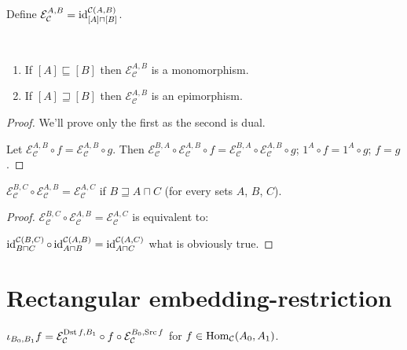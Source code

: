 \begin{defn}
Define $\mathcal{E}_{\mathcal{C}}^{A,B} =
\operatorname{id}^{\mathcal{C}(A,B)}_{[A]\sqcap[B]}$.
\end{defn}

\begin{prop}\label{e-mono-epi}
  ~  
  \begin{enumerate}
    \item If $[A]\sqsubseteq[B]$ then $\mathcal{E}_{\mathcal{C}}^{A,B}$ is a
    monomorphism.
    
    \item If $[A]\sqsupseteq[B]$ then $\mathcal{E}_{\mathcal{C}}^{A,B}$ is an
    epimorphism.
  \end{enumerate}
\end{prop}

\begin{proof}
  We'll prove only the first as the second is dual.
  
  Let $\mathcal{E}_{\mathcal{C}}^{A,B} \circ f = \mathcal{E}_{\mathcal{C}}^{A,B} \circ g$. Then
  $\mathcal{E}_{\mathcal{C}}^{B,A} \circ \mathcal{E}_{\mathcal{C}}^{A,B}
  \circ f = \mathcal{E}_{\mathcal{C}}^{B,A} \circ \mathcal{E}_{\mathcal{C}}^{A,B} \circ g$;
  $1^A \circ f = 1^A \circ g$; $f = g$.
\end{proof}

\begin{prop}
  $\mathcal{E}_{\mathcal{C}}^{B,C} \circ \mathcal{E}_{\mathcal{C}}^{A,B} = \mathcal{E}_{\mathcal{C}}^{A,C}$
  if $B \sqsupseteq A \sqcap C$ (for every sets $A$, $B$, $C$).
\end{prop}

\begin{proof}
  $\mathcal{E}_{\mathcal{C}}^{B,C} \circ \mathcal{E}_{\mathcal{C}}^{A,B} = \mathcal{E}_{\mathcal{C}}^{A,C}$
  is equivalent to:
  
  $\operatorname{id}^{\mathcal{C}(B,C)}_{B \sqcap C} \circ \operatorname{id}^{\mathcal{C}(A,B)}_{A \sqcap B} = \operatorname{id}^{\mathcal{C}(A,C)}_{A \sqcap C}$ what is obviously true.
\end{proof}

\section{Rectangular embedding-restriction}

\begin{defn}
  $\iota_{B_0, B_1} f = \mathcal{E}_{\mathcal{C}}^{\operatorname{Dst} f,B_1} \circ f \circ
  \mathcal{E}_{\mathcal{C}}^{B_0,\operatorname{Src} f}$ for $f \in
  \operatorname{Hom}_{\mathcal{C}} (A_0 , A_1)$.
\end{defn}

